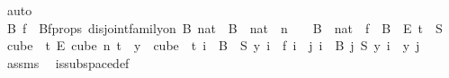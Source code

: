 \begin{isabellebody}
\ auto\isanewline
\ \ \isamarkupfalse%
\ B\ f\ \ Bf{\isacharunderscore}{\kern0pt}props{\isacharcolon}{\kern0pt}\ {\isachardoublequoteopen}disjoint{\isacharunderscore}{\kern0pt}family{\isacharunderscore}{\kern0pt}on\ B\ {\isacharbraceleft}{\kern0pt}{\isachardot}{\kern0pt}{\isachardot}{\kern0pt}{}{\isacharcolon}{\kern0pt}{\isacharcolon}{\kern0pt}nat{\isacharbraceright}{\kern0pt}\ {\isasymand}\ {\isasymUnion}{\isacharparenleft}{\kern0pt}B\ {\isacharbackquote}{\kern0pt}\ {\isacharbraceleft}{\kern0pt}{\isachardot}{\kern0pt}{\isachardot}{\kern0pt}{}{\isacharcolon}{\kern0pt}{\isacharcolon}{\kern0pt}nat{\isacharbraceright}{\kern0pt}{\isacharparenright}{\kern0pt}\ {\isacharequal}{\kern0pt}\ {\isacharbraceleft}{\kern0pt}{\isachardot}{\kern0pt}{\isachardot}{\kern0pt}{\isacharless}{\kern0pt}n{\isacharbraceright}{\kern0pt}\ {\isasymand}\ {\isacharparenleft}{\kern0pt}{\isacharbraceleft}{\kern0pt}{\isacharbraceright}{\kern0pt}\ {\isasymnotin}\ B\ {\isacharbackquote}{\kern0pt}\ {\isacharbraceleft}{\kern0pt}{\isachardot}{\kern0pt}{\isachardot}{\kern0pt}{\isacharless}{\kern0pt}{}{\isacharcolon}{\kern0pt}{\isacharcolon}{\kern0pt}nat{\isacharbraceright}{\kern0pt}{\isacharparenright}{\kern0pt}\ {\isasymand}\ f\ {\isasymin}\ {\isacharparenleft}{\kern0pt}B\ {}{\isacharparenright}{\kern0pt}\ {\isasymrightarrow}\isactrlsub E\ {\isacharbraceleft}{\kern0pt}{\isachardot}{\kern0pt}{\isachardot}{\kern0pt}{\isacharless}{\kern0pt}t{\isacharbraceright}{\kern0pt}\ {\isasymand}\ S\ {\isasymin}\ {\isacharparenleft}{\kern0pt}cube\ {}\ t{\isacharparenright}{\kern0pt}\ {\isasymrightarrow}\isactrlsub E\ {\isacharparenleft}{\kern0pt}cube\ n\ t{\isacharparenright}{\kern0pt}\ {\isasymand}\ {\isacharparenleft}{\kern0pt}{\isasymforall}y\ {\isasymin}\ cube\ {}\ t{\isachardot}{\kern0pt}\ {\isacharparenleft}{\kern0pt}{\isasymforall}i\ {\isasymin}\ B\ {}{\isachardot}{\kern0pt}\ S\ y\ i\ {\isacharequal}{\kern0pt}\ f\ i{\isacharparenright}{\kern0pt}\ {\isasymand}\ {\isacharparenleft}{\kern0pt}{\isasymforall}j{\isacharless}{\kern0pt}{}{\isachardot}{\kern0pt}\ {\isasymforall}i\ {\isasymin}\ B\ j{\isachardot}{\kern0pt}\ {\isacharparenleft}{\kern0pt}S\ y{\isacharparenright}{\kern0pt}\ i\ {\isacharequal}{\kern0pt}\ y\ j{\isacharparenright}{\kern0pt}{\isacharparenright}{\kern0pt}{\isachardoublequoteclose}\ \isamarkupfalse%
\ assms{\isacharparenleft}{\kern0pt}{}{\isacharparenright}{\kern0pt}\ \isamarkupfalse%
\ is{\isacharunderscore}{\kern0pt}subspace{\isacharunderscore}{\kern0pt}def\ \isamarkupfalse%

\end{isabellebody}
